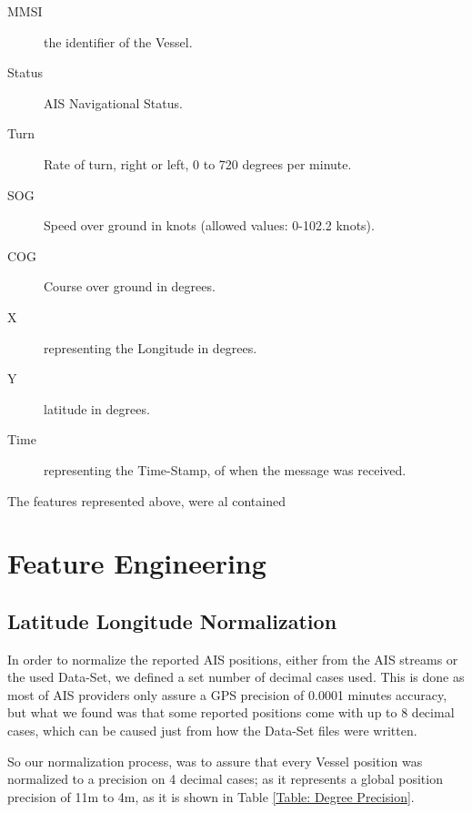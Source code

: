 \begin{description}
    \item[MMSI] the identifier of the Vessel.
    \item[Status] AIS Navigational Status.  
    \item[Turn] Rate of turn, right or left, 0 to 720 degrees per minute.
    \item[SOG] Speed over ground in knots (allowed values: 0-102.2 knots).
    \item[COG] Course over ground in degrees.
    \item[X] representing the Longitude in degrees.
    \item[Y] latitude in degrees.
    \item[Time] representing the Time-Stamp, of when the message was received.
\end{description}

 The features represented above, were al contained 

\section{Feature Engineering}

\subsection{Latitude Longitude Normalization}
In order to normalize the reported AIS positions, either from the AIS streams or the used Data-Set, we defined a set number of decimal cases used. This is done as most of AIS providers only assure a GPS precision of 0.0001 minutes accuracy, but what we found was that some reported positions come with up to 8 decimal cases, which can be caused just from how the Data-Set files were written.

So our normalization process, was to assure that every Vessel position was normalized to a precision on 4 decimal cases; as it represents a global position precision of 11m to 4m, as it is shown in Table \ref{Table: Degree Precision}.

